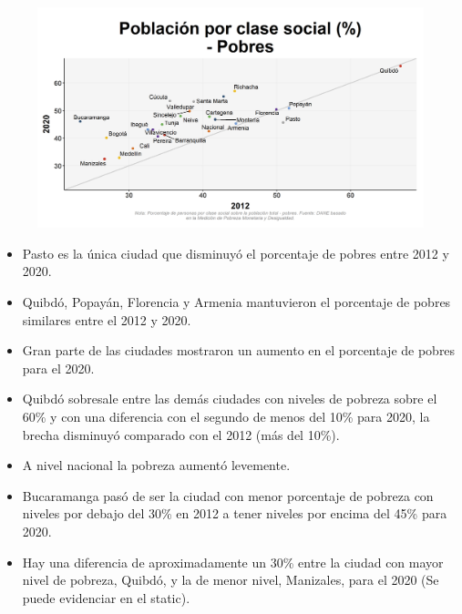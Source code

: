     \begin{figure}[H]
        \caption[Población por clase social - Pobres (2012 VS 2020) por ciudad ]{\label{pobres_ciudad_vs} }
        \begin{center}
        \includegraphics[width=\textwidth,keepaspectratio]{img/var_241_scatter_time.png}
        \end{center}
    \end{figure}
            \begin{itemize}
                    \item Pasto es la única ciudad que disminuyó el porcentaje de pobres entre 2012 y 2020.
                    \item Quibdó, Popayán, Florencia y Armenia mantuvieron el porcentaje de pobres similares entre el 2012 y 2020.
                    \item Gran parte de las ciudades mostraron un aumento en el porcentaje de pobres para el 2020.
                    \item Quibdó sobresale entre las demás ciudades con niveles de pobreza sobre el 60\% y con una diferencia con el segundo de menos del 10\% para 2020, la brecha disminuyó comparado con el 2012 (más del 10\%).
                    \item A nivel nacional la pobreza aumentó levemente.
                    \item Bucaramanga pasó de ser la ciudad con menor porcentaje de pobreza con niveles por debajo del 30\% en 2012 a tener niveles por encima del 45\% para 2020.
                    \item Hay una diferencia de aproximadamente un 30\% entre la ciudad con mayor nivel de pobreza, Quibdó, y la de menor nivel, Manizales, para el 2020 (Se puede evidenciar en el static).
                \end{itemize}

